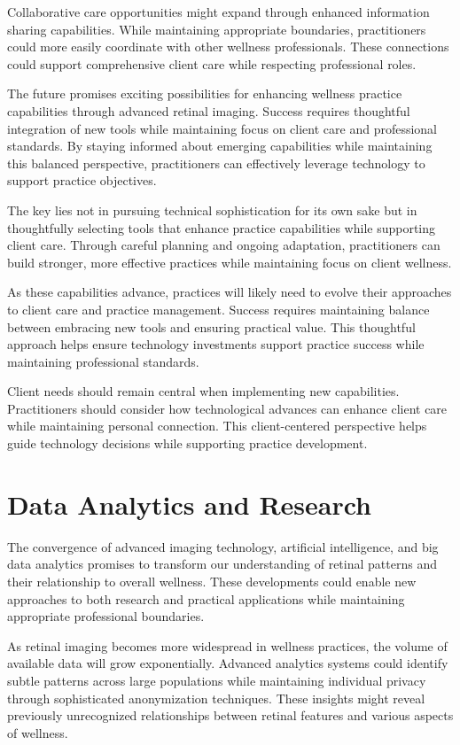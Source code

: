 \documentclass[
  Letterpaper,
]{scrbook}
\begin{document}
Collaborative care opportunities might expand through enhanced
information sharing capabilities. While maintaining appropriate
boundaries, practitioners could more easily coordinate with other
wellness professionals. These connections could support comprehensive
client care while respecting professional roles.

The future promises exciting possibilities for enhancing wellness
practice capabilities through advanced retinal imaging. Success requires
thoughtful integration of new tools while maintaining focus on client
care and professional standards. By staying informed about emerging
capabilities while maintaining this balanced perspective, practitioners
can effectively leverage technology to support practice objectives.

The key lies not in pursuing technical sophistication for its own sake
but in thoughtfully selecting tools that enhance practice capabilities
while supporting client care. Through careful planning and ongoing
adaptation, practitioners can build stronger, more effective practices
while maintaining focus on client wellness.

As these capabilities advance, practices will likely need to evolve
their approaches to client care and practice management. Success
requires maintaining balance between embracing new tools and ensuring
practical value. This thoughtful approach helps ensure technology
investments support practice success while maintaining professional
standards.

Client needs should remain central when implementing new capabilities.
Practitioners should consider how technological advances can enhance
client care while maintaining personal connection. This client-centered
perspective helps guide technology decisions while supporting practice
development.

\section{Data Analytics and Research}\label{data-analytics-and-research}

The convergence of advanced imaging technology, artificial intelligence,
and big data analytics promises to transform our understanding of
retinal patterns and their relationship to overall wellness. These
developments could enable new approaches to both research and practical
applications while maintaining appropriate professional boundaries.

As retinal imaging becomes more widespread in wellness practices, the
volume of available data will grow exponentially. Advanced analytics
systems could identify subtle patterns across large populations while
maintaining individual privacy through sophisticated anonymization
techniques. These insights might reveal previously unrecognized
relationships between retinal features and various aspects of wellness.
\end{document}
